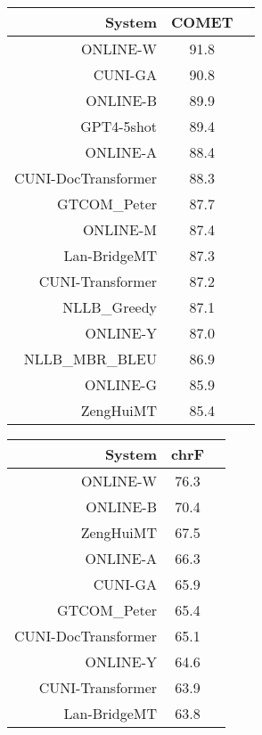 \documentclass[11pt]{article}
\begin{document}
\begin{table}
\scriptsize

\begin{subtable}[t]{0.33\textwidth}
\begin{tabular}{rcc}
\toprule 
System  & COMET \\ 
\midrule 
\rowcolor{ashgrey} ONLINE-W   & 91.8 \\ 
CUNI-GA  & 90.8 \\ 
\rowcolor{ashgrey} ONLINE-B   & 89.9 \\ 
\rowcolor{ashgrey} GPT4-5shot   & 89.4 \\ 
\rowcolor{ashgrey} ONLINE-A   & 88.4 \\ 
CUNI-DocTransformer & 88.3 \\ 
\rowcolor{ashgrey} GTCOM\_Peter   & 87.7 \\ 
\rowcolor{ashgrey} ONLINE-M   & 87.4 \\ 
\rowcolor{ashgrey} Lan-BridgeMT   & 87.3 \\ 
CUNI-Transformer & 87.2 \\ 
\rowcolor{ashgrey} NLLB\_Greedy   & 87.1 \\ 
\rowcolor{ashgrey} ONLINE-Y   & 87.0 \\ 
\rowcolor{ashgrey} NLLB\_MBR\_BLEU   & 86.9 \\ 
\rowcolor{ashgrey} ONLINE-G   & 85.9 \\ 
\rowcolor{ashgrey} ZengHuiMT   & 85.4 \\ 
\bottomrule 
\end{tabular} 
\end{subtable} 
\begin{subtable}[t]{0.33\textwidth}
\begin{tabular}{rcc}
\toprule 
System  & chrF \\ 
\midrule 
\rowcolor{ashgrey} ONLINE-W   & 76.3 \\ 
\rowcolor{ashgrey} ONLINE-B   & 70.4 \\ 
\rowcolor{ashgrey} ZengHuiMT   & 67.5 \\ 
\rowcolor{ashgrey} ONLINE-A   & 66.3 \\ 
CUNI-GA & 65.9 \\ 
\rowcolor{ashgrey} GTCOM\_Peter   & 65.4 \\ 
CUNI-DocTransformer  & 65.1 \\ 
\rowcolor{ashgrey} ONLINE-Y   & 64.6 \\ 
CUNI-Transformer  & 63.9 \\ 
\rowcolor{ashgrey} Lan-BridgeMT   & 63.8 \\ 

\end{tabular}
\end{subtable}
\end{table}
\end{document}
